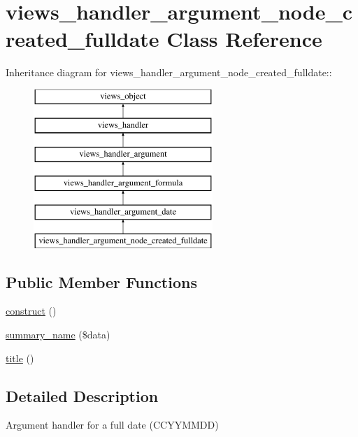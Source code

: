 \hypertarget{classviews__handler__argument__node__created__fulldate}{
\section{views\_\-handler\_\-argument\_\-node\_\-created\_\-fulldate Class Reference}
\label{classviews__handler__argument__node__created__fulldate}
}
Inheritance diagram for views\_\-handler\_\-argument\_\-node\_\-created\_\-fulldate::\begin{figure}[H]
\begin{center}
\leavevmode
\includegraphics[height=6cm]{classviews__handler__argument__node__created__fulldate}
\end{center}
\end{figure}
\subsection*{Public Member Functions}
\begin{CompactItemize}
\item 
\hyperlink{classviews__handler__argument__node__created__fulldate_f5b74c0204c9da9285cbe3e07ebed345}{construct} ()
\item 
\hyperlink{classviews__handler__argument__node__created__fulldate_b3d201e95c5307b166a85add6cfdebe2}{summary\_\-name} (\$data)
\item 
\hyperlink{classviews__handler__argument__node__created__fulldate_7e071511e9b2523b875b4ba983bbb8f2}{title} ()
\end{CompactItemize}


\subsection{Detailed Description}
Argument handler for a full date (CCYYMMDD) 

